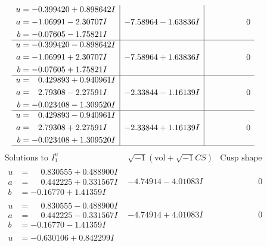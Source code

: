 \documentclass[1p]{elsarticle_modified}
\theoremstyle{definition}
\newcommand{\I}{\sqrt{-1}}
\begin{document}
$$\begin{array}{c|c|c}
\begin{aligned}
u &= -0.399420 + 0.898642 I \\
a &= -1.06991 - 2.30707 I \\
b &= -0.07605 - 1.75821 I\end{aligned}
 & -7.58964 - 1.63836 I & \phantom{-0.000000 } 0 \\ \hline\begin{aligned}
u &= -0.399420 - 0.898642 I \\
a &= -1.06991 + 2.30707 I \\
b &= -0.07605 + 1.75821 I\end{aligned}
 & -7.58964 + 1.63836 I & \phantom{-0.000000 } 0 \\ \hline\begin{aligned}
u &= \phantom{-}0.429893 + 0.940961 I \\
a &= \phantom{-}2.79308 - 2.27591 I \\
b &= -0.023408 - 1.309520 I\end{aligned}
 & -2.33844 - 1.16139 I & \phantom{-0.000000 } 0 \\ \hline\begin{aligned}
u &= \phantom{-}0.429893 - 0.940961 I \\
a &= \phantom{-}2.79308 + 2.27591 I \\
b &= -0.023408 + 1.309520 I\end{aligned}
 & -2.33844 + 1.16139 I & \phantom{-0.000000 } 0\\
 \hline 
 \end{array}$$\newpage$$\begin{array}{c|c|c}  
\text{Solutions to }I^u_{1}& \I (\text{vol} + \sqrt{-1}CS) & \text{Cusp shape}\\
 \hline 
\begin{aligned}
u &= \phantom{-}0.830555 + 0.488900 I \\
a &= \phantom{-}0.442225 + 0.331567 I \\
b &= -0.16770 + 1.41359 I\end{aligned}
 & -4.74914 - 4.01083 I & \phantom{-0.000000 } 0 \\ \hline\begin{aligned}
u &= \phantom{-}0.830555 - 0.488900 I \\
a &= \phantom{-}0.442225 - 0.331567 I \\
b &= -0.16770 - 1.41359 I\end{aligned}
 & -4.74914 + 4.01083 I & \phantom{-0.000000 } 0 \\ \hline\begin{aligned}
u &= -0.630106 + 0.842299 I \\

\end{aligned}
\end{array}$$
\end{document}
